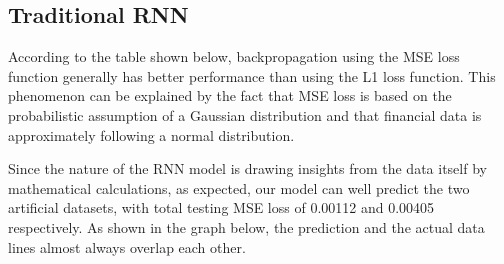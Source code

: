 \documentclass[letterpaper, 10 pt, conference]{ieeeconf}  %
\begin{document}
    \begin{table}[t]
        \centering
        \captionsetup{justification=centering,margin=2cm}
        \caption{Table containing the final loss (MSE and L1) of testing and training after 50 epochs for LSTM.}
    \end{table}

    \subsection{Traditional RNN}
        According to the table shown below, backpropagation using the MSE loss function generally has better performance than using the L1 loss function. This phenomenon can be explained by the fact that MSE loss is based on the probabilistic assumption of a Gaussian distribution and that financial data is approximately following a normal distribution. 
    
        Since the nature of the RNN model is drawing insights from the data itself by mathematical calculations, as expected, our model can well predict the two artificial datasets, with total testing MSE loss of 0.00112 and 0.00405 respectively. As shown in the graph below, the prediction and the actual data lines almost always overlap each other.
 
\end{document}
